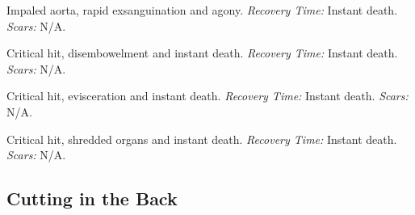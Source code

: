 \documentclass[12pt]{book}  %
\begin{document}
\begin{description}[labelwidth=1.5em, leftmargin=*, itemsep=0.4em]
    \item[17 -] Impaled aorta, rapid exsanguination and agony. \textit{Recovery Time:} Instant death. \textit{Scars:} N/A.
    \item[18 -] Critical hit, disembowelment and instant death. \textit{Recovery Time:} Instant death. \textit{Scars:} N/A.
    \item[19 -] Critical hit, evisceration and instant death. \textit{Recovery Time:} Instant death. \textit{Scars:} N/A.
    \item[20 -] Critical hit, shredded organs and instant death. \textit{Recovery Time:} Instant death. \textit{Scars:} N/A.
\end{description}

\subsection{Cutting in the Back}
\end{document}

